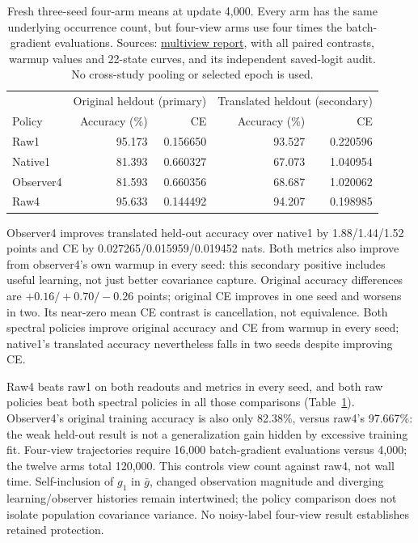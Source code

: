 \documentclass[10pt]{article}
\newcommand{\src}[2]{\href{../../../#1}{#2}}
\begin{document}
\begin{table}[htbp]
\centering\small
\begin{tabular}{lrrrr}
\toprule
& \multicolumn{2}{c}{Original heldout (primary)} & \multicolumn{2}{c}{Translated heldout (secondary)}\\
Policy & Accuracy (\%) & CE & Accuracy (\%) & CE\\\midrule
Raw1 & 95.173 & 0.156650 & 93.527 & 0.220596\\
Native1 & 81.393 & 0.660327 & 67.073 & 1.040954\\
Observer4 & 81.593 & 0.660356 & 68.687 & 1.020062\\
Raw4 & 95.633 & 0.144492 & 94.207 & 0.198985\\\bottomrule
\end{tabular}
\caption{Fresh three-seed four-arm means at update 4,000. Every arm has the same underlying occurrence count, but four-view arms use four times the batch-gradient evaluations. Sources: \src{output/2026-09-10-spectral-multiview-clean/results.md}{multiview report}, with all paired contrasts, warmup values and 22-state curves, and its independent saved-logit audit. No cross-study pooling or selected epoch is used.}
\label{tab:multiview}
\end{table}

Observer4 improves translated held-out accuracy over native1 by 1.88/1.44/1.52 points and CE by 0.027265/0.015959/0.019452 nats. Both metrics also improve from observer4's own warmup in every seed: this secondary positive includes useful learning, not just better covariance capture. Original accuracy differences are $+0.16/+0.70/-0.26$ points; original CE improves in one seed and worsens in two. Its near-zero mean CE contrast is cancellation, not equivalence. Both spectral policies improve original accuracy and CE from warmup in every seed; native1's translated accuracy nevertheless falls in two seeds despite improving CE.

Raw4 beats raw1 on both readouts and metrics in every seed, and both raw policies beat both spectral policies in all those comparisons (Table~\ref{tab:multiview}). Observer4's original training accuracy is also only 82.38\%, versus raw4's 97.667\%: the weak held-out result is not a generalization gain hidden by excessive training fit. Four-view trajectories require 16,000 batch-gradient evaluations versus 4,000; the twelve arms total 120,000. This controls view count against raw4, not wall time. Self-inclusion of $g_1$ in $\bar g$, changed observation magnitude and diverging learning/observer histories remain intertwined; the policy comparison does not isolate population covariance variance. No noisy-label four-view result establishes retained protection.
\end{document}
